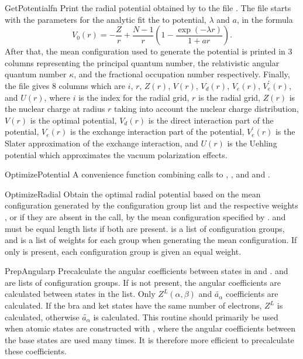 \begin{fundesc}{GetPotential}{fn}
Print the radial potential obtained by  to the file
. The file starts with the parameters for the analytic fit the to
potential, $\lambda$ and $a$, in the formula
\begin{equation}
V_0(r) = -\frac{Z}{r} + \frac{N-1}{r}\left(1-\frac{\exp(-\lambda
r)}{1+ar}\right).
\end{equation}
After that, the mean configuration used to generate the potential is printed
in 3 columns representing the principal quantum number, the relativistic
angular quantum number $\kappa$, and the fractional occupation number
respectively. Finally, the file gives 8 columns which are $i$, $r$, $Z(r)$,
$V(r)$, $V_d(r)$, $V_e(r)$, $V_e^\prime(r)$, and $U(r)$, where $i$ is the index
for the radial grid, $r$ is the radial grid, $Z(r)$ is the nuclear charge at
radius $r$ taking into account the nuclear charge distribution, $V(r)$ is the
optimal potential, $V_d(r)$ is the direct interaction part of the potential,
$V_e(r)$ is the exchange interaction part of the potential, $V_e^\prime(r)$ is
the Slater approximation of the exchange interaction, and $U(r)$ is the
Uehling potential which approximates the vacuum polarization effects.
\end{fundesc}

\begin{fundesc}{OptimizePotential}{}
A convenience function combining calls to ,
, and and .
\end{fundesc}

\begin{fundesc}{OptimizeRadial}{}
Obtain the optimal radial potential based on the mean configuration generated by
the configuration group list  and the respective weights , or if
they are absent in the call, by the mean configuration specified by
.  and  must be equal length lists if both are
present.  is a list of configuration groups, and  is a list of
weights for each group when generating the mean configuration. If only 
is present, each configuration group is given an equal weight.
\end{fundesc}

\begin{fundesc}{PrepAngular}{p}
Precalculate the angular coefficients between states in  and
.  and  are lists of configuration groups. If  is
not present, the angular coefficients are calculated between states in the
 list. Only $Z^L(\alpha,\beta)$ and $\tilde{a_\alpha}$ coefficients are
calculated. If the bra and ket states have the same number of electrons, $Z^L$
is calculated, otherwise $\tilde{a_\alpha}$ is calculated. This routine should
primarily be used when atomic states are constructed with ,
where the angular coefficients between the base states are used many times. It
is therefore more efficient to precalculate these coefficients.
\end{fundesc}

